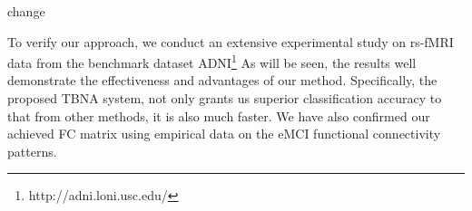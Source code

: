 \documentclass[journal]{IEEEtran}
\begin{document}
	change
	
	
	
	To verify our approach, we conduct an extensive experimental study on rs-fMRI data from the
	benchmark dataset ADNI\footnote{http://adni.loni.usc.edu/} As will be seen, the results well demonstrate the effectiveness and advantages of our method. Specifically, the proposed TBNA system, not only grants us superior classification accuracy to that from other methods, it is also much faster. We have also confirmed our achieved FC matrix using empirical data on the eMCI functional connectivity patterns.
	
	
	
	
	
	
	
\end{document}
